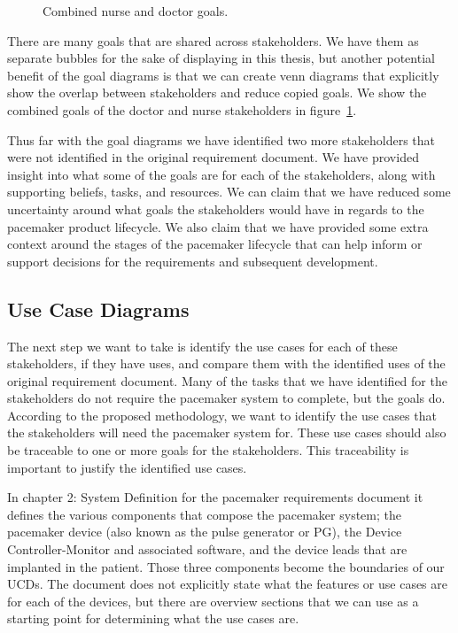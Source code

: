 \begin{figure}
	\centering
	
	\caption{Combined nurse and doctor goals.}
	\label{fig:nurse_doctor_combined}
\end{figure}

There are many goals that are shared across stakeholders. We have them as separate bubbles for the sake of displaying in this thesis, but another potential benefit of the goal diagrams is that we can create venn diagrams that explicitly show the overlap between stakeholders and reduce copied goals. We show the combined goals of the doctor and nurse stakeholders in figure~\ref{fig:nurse_doctor_combined}.

Thus far with the goal diagrams we have identified two more stakeholders that were not identified in the original requirement document. We have provided insight into what some of the goals are for each of the stakeholders, along with supporting beliefs, tasks, and resources. We can claim that we have reduced some uncertainty around what goals the stakeholders would have in regards to the pacemaker product lifecycle. We also claim that we have provided some extra context around the stages of the pacemaker lifecycle that can help inform or support decisions for the requirements and subsequent development.

\subsection{Use Case Diagrams}

The next step we want to take is identify the use cases for each of these stakeholders, if they have uses, and compare them with the identified uses of the original requirement document. Many of the tasks that we have identified for the stakeholders do not require the pacemaker system to complete, but the goals do. According to the proposed methodology, we want to identify the use cases that the stakeholders will need the pacemaker system for. These use cases should also be traceable to one or more goals for the stakeholders. This traceability is important to justify the identified use cases.

In chapter 2: System Definition for the pacemaker requirements document it defines the various components that compose the pacemaker system; the pacemaker device (also known as the pulse generator or PG), the Device Controller-Monitor and associated software, and the device leads that are implanted in the patient. Those three components become the boundaries of our UCDs. The document does not explicitly state what the features or use cases are for each of the devices, but there are overview sections that we can use as a starting point for determining what the use cases are.


